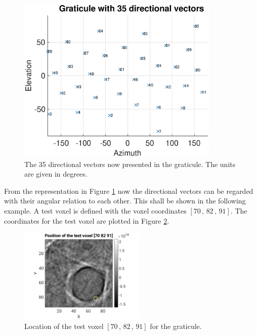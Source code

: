 \begin{figure}[H]
    \centering
    \includegraphics[width=0.86\textwidth]{Graphics/Results/gradnetz/graticule_35_vectors.eps}
    \caption{The 35 directional vectors now presented in the graticule. The units are given in degrees. }
    \label{fig:fertig_gradnetz}
\end{figure}

From the representation in Figure \ref{fig:fertig_gradnetz} now the directional vectors can be regarded with their angular relation to each other. This shall be shown in the following example. A test voxel is defined with the voxel coordinates $[70\, , \, 82\, , \, 91]$. The coordinates for the test voxel are plotted in Figure \ref{fig:gadnetz_location_testvoxel}.

\begin{figure}[H]
    \centering
    \includegraphics[width=0.536\textwidth]{Graphics/Results/gradnetz/positionof_test_voxel_for-gradnetz.png}
    \caption{Location of the test voxel $[70\, , \, 82\, , \, 91]$ for the graticule. }
    \label{fig:gadnetz_location_testvoxel}
\end{figure}

